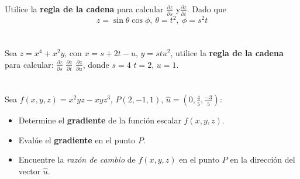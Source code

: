 \documentclass[12pt]{article}
\begin{document}
\section{}

Utilice la \textbf{regla de la cadena} para calcular $\frac{\partial z}{\partial s}$ y$\frac{\partial z}{\partial t}$. Dado que
$$z = \sin{\theta}\cos{\phi}, ~ \theta = t^2, ~ \phi = s^2t$$

\section{}

Sea $z = x^4 + x^2y$, con $x = s + 2t − u$, $y = stu^2$, utilice la \textbf{regla de la cadena} para calcular: $\frac{\partial z}{\partial s}$ $\frac{\partial z}{\partial t}$ $\frac{\partial z}{\partial u}$, donde $s=4$ $t=2$, $u=1$.

\section{}

Sea $f(x, y, z) = x^2yz - xyz^3$, $P(2, -1, 1)$, $\hat{u} = \left (0,\frac{4}{5},\frac{-3}{5} \right)$:

\begin{itemize}[format=\textbf]
  
\item Determine el \textbf{gradiente} de la función escalar $f(x, y, z)$.

\item Evalúe el \textbf{gradiente} en el punto $P$.

\item Encuentre la \textit{razón de cambio} de $f(x, y, z)$ en el punto $P$ en la dirección del vector $\hat{u}$.
\end{itemize}

\section{}
\end{document}
